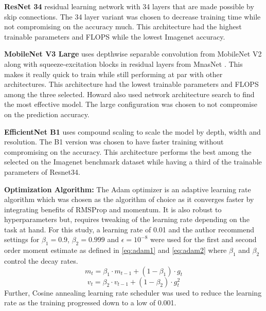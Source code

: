 \documentclass[10pt,twocolumn,letterpaper]{article}
\begin{document}
\textbf{ResNet 34} residual learning network with 34 layers that are made possible by skip 
connections. The 34 layer variant was chosen to decrease training time while not compromising on 
the accuracy much. This architecture had the highest trainable parameters and FLOPS while the lowest 
Imagenet accuracy.
\cite{he2016deep}

\textbf{MobileNet V3 Large} uses depthwise separable convolution from MobileNet V2 
\cite{sandler2018mobilenetv2} along with squeeze-excitation blocks in residual layers 
from MnasNet \cite{tan2019mnasnet}. This makes it really quick to train while still performing 
at par with other architectures. This architecture had the lowest trainable parameters and FLOPS 
among the three selected. Howard \etal \cite{howard2019searching} also used 
network architecture search to find the most effective model. The large configuration 
was chosen to not compromise on the prediction accuracy.

\textbf{EfficientNet B1} uses compound scaling to scale the model by depth, width and 
resolution. The B1 version was chosen to have faster training without compromising on the 
accuracy. \cite{tan2019efficientnet} This architecture performs the best among the selected 
on the Imagenet benchmark dataset while having a third of the trainable parameters of Resnet34.

\textbf{Optimization Algorithm:}
The Adam optimizer \cite{kingma2014adam} is an adaptive learning rate algorithm which 
was chosen as the algorithm of choice as it converges faster by integrating benefits of  
RMSProp and momentum. It is also robust to hyperparameters but, 
requires tweaking of the learning rate depending on the task at hand. For this study, 
a learning rate of 0.01 and the author recommend settings for $\beta_{1} =
0.9$, $\beta_{2} = 0.999$ and $\epsilon = 10^{-8}$ were used for the first and second order moment estimate 
as defined in \cref{eq:adam1} and \cref{eq:adam2} where $\beta_{1}$ and $\beta_{2}$ control the decay rates.
\begin{equation}
m_{t} = \beta_{1} \cdot m_{t-1} + (1 - \beta_{1}) \cdot g_{t}
\label{eq:adam1}
\end{equation}
\begin{equation}
  v_{t} = \beta_{2} \cdot v_{t-1} + (1 - \beta_{2}) \cdot g_{t}^{2}
  \label{eq:adam2}
  \end{equation}
Further, Cosine annealing \cite{loshchilov2016sgdr} learning rate scheduler was used 
to reduce the learning rate as the training progressed down to a low of 0.001. 
\end{document}
